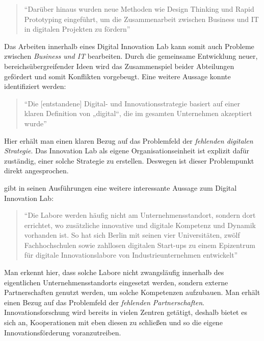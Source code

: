 \begin{quote}
	``Darüber hinaus wurden neue Methoden wie Design Thinking und Rapid Prototyping eingeführt, um die Zusammenarbeit zwischen Business und IT in digitalen Projekten zu fördern'' \cite[S. 261]{urbach_digitalization_2018}
\end{quote}

Das Arbeiten innerhalb eines Digital Innovation Lab kann somit auch Probleme zwischen \textit{Business und IT} bearbeiten. Durch die gemeinsame Entwicklung neuer, bereichsübergreifender Ideen wird das Zusammenspiel beider Abteilungen gefördert und somit Konflikten vorgebeugt. Eine weitere Aussage konnte identifiziert werden:

\begin{quote}
	``Die [entstandene] Digital- und Innovationsstrategie basiert auf einer klaren Definition von „digital“, die im gesamten Unternehmen akzeptiert wurde'' \cite[S. 259]{urbach_digitalization_2018}
\end{quote}

Hier erhält man einen klaren Bezug auf das Problemfeld der \textit{fehlenden digitalen Strategie}. Das Innovation Lab als eigene Organisationseinheit ist explizit dafür zuständig, einer solche Strategie zu erstellen. Deswegen ist dieser Problempunkt direkt angesprochen.

 gibt in seinen Ausführungen eine weitere interessante Aussage zum Digital Innovation Lab:

\begin{quote}
	``Die Labore werden häufig nicht am Unternehmensstandort, sondern dort errichtet, wo zusätzliche innovative und digitale Kompetenz und Dynamik vorhanden ist. So hat sich Berlin mit seinen vier Universitäten, zwölf Fachhochschulen sowie zahllosen digitalen Start-ups zu einem Epizentrum für digitale Innovationslabore von Industrieunternehmen entwickelt'' \cite[S. 183]{weinreich_lean_2016}
\end{quote}

Man erkennt hier, dass solche Labore nicht zwangsläufig innerhalb des eigentlichen Unternehmensstandorts eingesetzt werden, sondern externe Partnerschaften genutzt werden, um solche Kompetenzen aufzubauen. Man erhält einen Bezug auf das Problemfeld der \textit{fehlenden Partnerschaften}. Innovationsforschung wird bereits in vielen Zentren getätigt, deshalb bietet es sich an, Kooperationen mit eben diesen zu schließen und so die eigene Innovationsförderung voranzutreiben.

